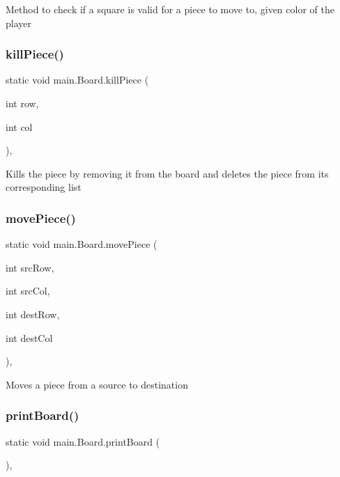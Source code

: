Method to check if a square is valid for a piece to move to, given color of the player \mbox{\label{classmain_1_1_board_a4faa6115089869b0dc2590ac45bb14b4}} 
\subsubsection{\texorpdfstring{kill\+Piece()}{killPiece()}}
{\footnotesize\ttfamily static void main.\+Board.\+kill\+Piece (\begin{DoxyParamCaption}\item[{int}]{row,  }\item[{int}]{col }\end{DoxyParamCaption})\hspace{0.3cm}{\ttfamily [inline]}, {\ttfamily [static]}}

Kills the piece by removing it from the board and deletes the piece from its corresponding list \mbox{\label{classmain_1_1_board_a5c62ecfe1552578c134322f291ce0d58}} 
\subsubsection{\texorpdfstring{move\+Piece()}{movePiece()}}
{\footnotesize\ttfamily static void main.\+Board.\+move\+Piece (\begin{DoxyParamCaption}\item[{int}]{src\+Row,  }\item[{int}]{src\+Col,  }\item[{int}]{dest\+Row,  }\item[{int}]{dest\+Col }\end{DoxyParamCaption})\hspace{0.3cm}{\ttfamily [inline]}, {\ttfamily [static]}}

Moves a piece from a source to destination \mbox{\label{classmain_1_1_board_a8827dbdb62886f10405270f28de92c71}} 
\subsubsection{\texorpdfstring{print\+Board()}{printBoard()}}
{\footnotesize\ttfamily static void main.\+Board.\+print\+Board (\begin{DoxyParamCaption}{ }\end{DoxyParamCaption})\hspace{0.3cm}{\ttfamily [inline]}, {\ttfamily [static]}}

